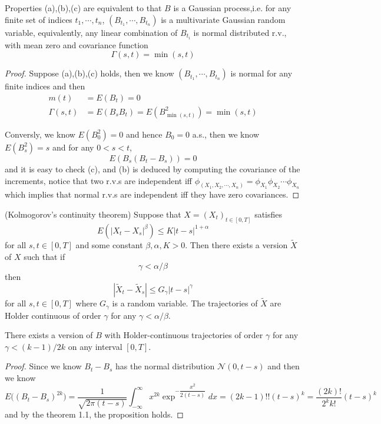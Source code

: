 \documentclass[lang=en, color=blue, ]{elegantbook}
\begin{document}
\begin{proposition}
    Properties (a),(b),(c) are equivalent to that $B$ is a Gaussian process,i.e. for any finite set of indices $t_1,\cdots,t_n$, $(B_{t_1},\cdots,B_{t_n})$ is a multivariate Gaussian random variable, equivalently, any linear combination of $B_{t_i}$ is normal distributed r.v., with mean zero and covariance function
    \[\Gamma(s,t) = \min(s,t)\]
\end{proposition}
\begin{proof}\par
    Suppose (a),(b),(c) holds, then we know $(B_{t_1},\cdots,B_{t_n})$ is normal for any finite indices and then
    \[
    \begin{aligned}
        m(t) &= E(B_t) = 0\\
        \Gamma(s,t)&=E(B_sB_t) =E(B_{\min(s,t)}^2) = \min(s,t) 
    \end{aligned}
    \]\par
    Conversly, we know $E(B_0^2) = 0$ and hence $B_0 = 0$ a.s., then we know $E(B_s^2) = s$ and for any $0<s<t$,
    \[
    E(B_s(B_t-B_s)) = 0
    \]
    and it is easy to check (c), and (b) is deduced by computing the covariance of the increments, notice that two r.v.s are independent iff $\phi_{(X_1,X_2,\cdots,X_n)} = \phi_{X_1}\phi_{X_2}\cdots\phi_{X_n}$ which implies that normal r.v.s are independent iff they have zero covariances.
\end{proof}

\begin{theorem}
    (Kolmogorov's continuity theorem) Suppose that $X= (X_t)_{t\in[0,T]}$ satisfies
    \[E(|X_t-X_s|^{\beta}) \leq K|t-s|^{1+\alpha}\]
    for all $s,t\in[0,T]$ and some constant $\beta,\alpha,K>0$. Then there exists a version $\tilde{X}$ of $X$ such that if
    \[\gamma < \alpha/\beta\]
    then
    \[|\tilde{X}_{t}-\tilde{X}_s| \leq G_{\gamma}|t-s|^{\gamma}\]
    for all $s,t\in[0,T]$ where $G_{\gamma}$ is a random variable. The trajectories of $\tilde{X}$ are Holder continuous of order $\gamma$ for any $\gamma < \alpha/\beta$.
\end{theorem}

\begin{proposition}
    There exists a version of $B$ with Holder-continuous trajectories of order $\gamma$ for any $\gamma < (k-1)/2k$ on any interval $[0,T]$.
\end{proposition}
\begin{proof}\par
    Since we know $B_t-B_s$ has the normal distribution $\mathcal{N}(0,t-s)$ and then we know
    \[
    E\Big((B_t-B_s)^{2k}\Big) = \dfrac{1}{\sqrt{2\pi(t-s)}}\int_{-\infty}^{\infty}x^{2k} \exp^{-\dfrac{x^2}{2(t-s)}} dx = (2k-1)!!(t-s)^k = \dfrac{(2k)!}{2^kk!}(t-s)^k
    \]
    and by the theorem 1.1, the proposition holds.
\end{proof}
\end{document}
